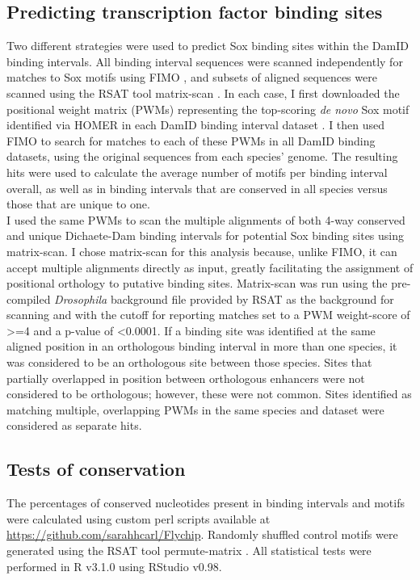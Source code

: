 \subsection{Predicting transcription factor binding sites}
Two different strategies were used to predict Sox binding sites within the DamID binding intervals. All binding interval sequences were scanned independently for matches to Sox motifs using FIMO \citep{grant_fimo:_2011}, and subsets of aligned sequences were scanned using the RSAT tool matrix-scan \citep{sand_analyzing_2008,turatsinze_using_2008}. In each case, I first downloaded the positional weight matrix (PWMs) representing the top-scoring \emph{de novo} Sox motif identified via HOMER in each DamID binding interval dataset \citep{heinz_simple_2010}. I then used FIMO to search for matches to each of these PWMs in all DamID binding datasets, using the original sequences from each species’ genome. The resulting hits were used to calculate the average number of motifs per binding interval overall, as well as in binding intervals that are conserved in all species versus those that are unique to one.\\

I used the same PWMs to scan the multiple alignments of both 4-way conserved and unique Dichaete-Dam binding intervals for potential Sox binding sites using matrix-scan. I chose matrix-scan for this analysis because, unlike FIMO, it can accept multiple alignments directly as input, greatly facilitating the assignment of positional orthology to putative binding sites. Matrix-scan was run using the pre-compiled \emph{Drosophila} background file provided by RSAT as the background for scanning and with the cutoff for reporting matches set to a PWM weight-score of \textgreater=4 and a p-value of \textless 0.0001. If a binding site was identified at the same aligned position in an orthologous binding interval in more than one species, it was considered to be an orthologous site between those species. Sites that partially overlapped in position between orthologous enhancers were not considered to be orthologous; however, these were not common. Sites identified as matching multiple, overlapping PWMs in the same species and dataset were considered as separate hits. 

\subsection{Tests of conservation}
The percentages of conserved nucleotides present in binding intervals and motifs were calculated using custom perl scripts available at \url{https://github.com/sarahhcarl/Flychip}. Randomly shuffled control motifs were generated using the RSAT tool permute-matrix \citep{thomas-chollier_rsat_2011}. All statistical tests were performed in R v3.1.0 using RStudio v0.98.
